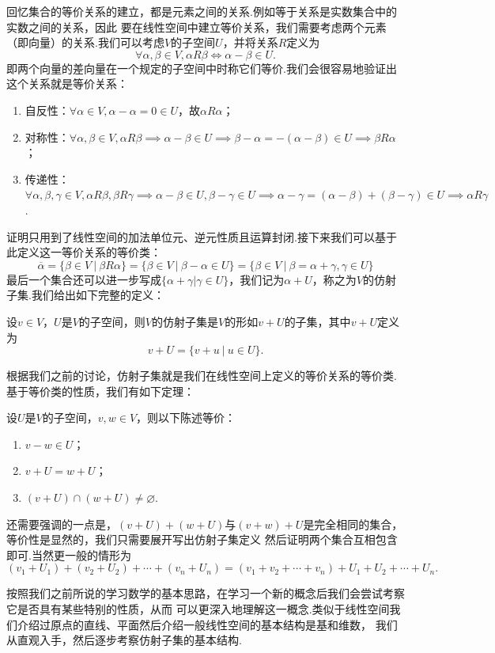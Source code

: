 回忆集合的等价关系的建立，都是元素之间的关系.例如等于关系是实数集合中的实数之间的关系，因此
要在线性空间中建立等价关系，我们需要考虑两个元素（即向量）的关系.我们可以考虑$V$的子空间$U$，并将关系$R$定义为
\[\forall\alpha,\beta\in V,\alpha R\beta\iff \alpha-\beta\in U.\]
即两个向量的差向量在一个规定的子空间中时称它们等价.我们会很容易地验证出这个关系就是等价关系：
\begin{enumerate}
    \item 自反性：$\forall \alpha\in V,\alpha-\alpha=0\in U$，故$\alpha R\alpha$；
    \item 对称性：$\forall \alpha,\beta\in V,\alpha R\beta\implies \alpha-\beta\in U\implies \beta-\alpha=-(\alpha-\beta)\in U\implies \beta R\alpha$；
    \item 传递性：$\forall \alpha,\beta,\gamma\in V,\alpha R\beta,\beta R\gamma\implies \alpha-\beta\in U,\beta-\gamma\in U\implies \alpha-\gamma=(\alpha-\beta)+(\beta-\gamma)\in U\implies \alpha R\gamma$.
\end{enumerate}
证明只用到了线性空间的加法单位元、逆元性质且运算封闭.接下来我们可以基于此定义这一等价关系的等价类：
\[\overline{\alpha}=\{\beta\in V\ |\ \beta R\alpha\}=\{\beta\in V\ |\ \beta-\alpha\in U\}=\{\beta\in V\ |\ \beta=\alpha+\gamma,\gamma\in U\}\]
最后一个集合还可以进一步写成$\{\alpha+\gamma|\gamma\in U\}$，我们记为$\alpha+U$，称之为$V$的仿射子集.我们给出如下完整的定义：
\begin{definition}
    设$v\in V$，$U$是$V$的子空间，则$V$的仿射子集是$V$的形如$v+U$的子集，其中$v+U$定义为
    \[v+U=\{v+u\ |\ u\in U\}.\]
\end{definition}
根据我们之前的讨论，仿射子集就是我们在线性空间上定义的等价关系的等价类.基于等价类的性质，我们有如下定理：
\begin{theorem}
    设$U$是$V$的子空间，$v,w\in V$，则以下陈述等价：
    \begin{enumerate}
        \item $v-w\in U$；
        \item $v+U=w+U$；
        \item $(v+U)\cap(w+U)\neq \varnothing$.
    \end{enumerate}
\end{theorem}

还需要强调的一点是，$(v+U)+(w+U)$与$(v+w)+U$是完全相同的集合，等价性是显然的，我们只需要展开写出仿射子集定义
然后证明两个集合互相包含即可.当然更一般的情形为
\[(v_1+U_1)+(v_2+U_2)+\cdots+(v_n+U_n)=(v_1+v_2+\cdots+v_n)+U_1+U_2+\cdots+U_n.\]

按照我们之前所说的学习数学的基本思路，在学习一个新的概念后我们会尝试考察它是否具有某些特别的性质，从而
可以更深入地理解这一概念.类似于线性空间我们介绍过原点的直线、平面然后介绍一般线性空间的基本结构是基和维数，
我们从直观入手，然后逐步考察仿射子集的基本结构.

